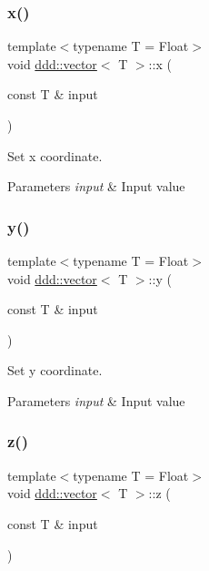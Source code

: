 \subsubsection{\texorpdfstring{x()}{x()}}
{\footnotesize\ttfamily template$<$typename T = Float$>$ \\
void \hyperlink{classddd_1_1vector}{ddd\+::vector}$<$ T $>$\+::x (\begin{DoxyParamCaption}\item[{const T \&}]{input }\end{DoxyParamCaption})\hspace{0.3cm}{\ttfamily [inline]}}



Set x coordinate. 


\begin{DoxyParams}{Parameters}
{\em input} & Input value \\
\hline
\end{DoxyParams}
\mbox{\label{classddd_1_1vector_a516506aadad05ec33fca8e01a63ab19f}} 
\subsubsection{\texorpdfstring{y()}{y()}}
{\footnotesize\ttfamily template$<$typename T = Float$>$ \\
void \hyperlink{classddd_1_1vector}{ddd\+::vector}$<$ T $>$\+::y (\begin{DoxyParamCaption}\item[{const T \&}]{input }\end{DoxyParamCaption})\hspace{0.3cm}{\ttfamily [inline]}}



Set y coordinate. 


\begin{DoxyParams}{Parameters}
{\em input} & Input value \\
\hline
\end{DoxyParams}
\mbox{\label{classddd_1_1vector_a998ea9276d8f3c706b98d4eab9ebcaf3}} 
\subsubsection{\texorpdfstring{z()}{z()}}
{\footnotesize\ttfamily template$<$typename T = Float$>$ \\
void \hyperlink{classddd_1_1vector}{ddd\+::vector}$<$ T $>$\+::z (\begin{DoxyParamCaption}\item[{const T \&}]{input }\end{DoxyParamCaption})\hspace{0.3cm}{\ttfamily [inline]}}



